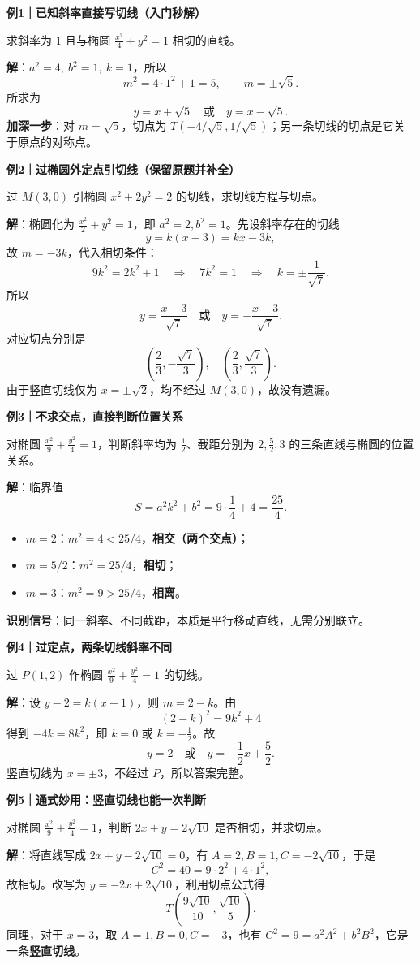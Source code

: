 \begin{examplebox}
\textbf{例1｜已知斜率直接写切线（入门秒解）}\par
求斜率为 $1$ 且与椭圆 $\frac{x^2}{4}+y^2=1$ 相切的直线。\par
\textbf{解}：$a^2=4,\ b^2=1,\ k=1$，所以
\[
m^2=4\cdot1^2+1=5,\qquad m=\pm\sqrt5.
\]
所求为
\[
\boxed{y=x+\sqrt5\quad\text{或}\quad y=x-\sqrt5.}
\]
\textbf{加深一步}：对 $m=\sqrt5$，切点为 $T(-4/\sqrt5,1/\sqrt5)$；另一条切线的切点是它关于原点的对称点。

\medskip
\textbf{例2｜过椭圆外定点引切线（保留原题并补全）}\par
过 $M(3,0)$ 引椭圆 $x^2+2y^2=2$ 的切线，求切线方程与切点。\par
\textbf{解}：椭圆化为 $\frac{x^2}{2}+y^2=1$，即 $a^2=2,b^2=1$。先设斜率存在的切线
\[
y=k(x-3)=kx-3k,
\]
故 $m=-3k$，代入相切条件：
\[
9k^2=2k^2+1\quad\Longrightarrow\quad
7k^2=1\quad\Longrightarrow\quad k=\pm\frac1{\sqrt7}.
\]
所以
\[
\boxed{y=\frac{x-3}{\sqrt7}\quad\text{或}\quad
       y=-\frac{x-3}{\sqrt7}.}
\]
对应切点分别是
\[
\boxed{\left(\frac23,-\frac{\sqrt7}{3}\right),\quad
       \left(\frac23,\frac{\sqrt7}{3}\right).}
\]
由于竖直切线仅为 $x=\pm\sqrt2$，均不经过 $M(3,0)$，故没有遗漏。

\medskip
\textbf{例3｜不求交点，直接判断位置关系}\par
对椭圆 $\frac{x^2}{9}+\frac{y^2}{4}=1$，判断斜率均为 $\frac12$、截距分别为 $2,\frac52,3$ 的三条直线与椭圆的位置关系。\par
\textbf{解}：临界值
\[
S=a^2k^2+b^2=9\cdot\frac14+4=\frac{25}{4}.
\]
\begin{itemize}
    \item $m=2$：$m^2=4<25/4$，\textbf{相交（两个交点）}；
    \item $m=5/2$：$m^2=25/4$，\textbf{相切}；
    \item $m=3$：$m^2=9>25/4$，\textbf{相离}。
\end{itemize}
\textbf{识别信号}：同一斜率、不同截距，本质是平行移动直线，无需分别联立。

\medskip
\textbf{例4｜过定点，两条切线斜率不同}\par
过 $P(1,2)$ 作椭圆 $\frac{x^2}{9}+\frac{y^2}{4}=1$ 的切线。\par
\textbf{解}：设 $y-2=k(x-1)$，则 $m=2-k$。由
\[
(2-k)^2=9k^2+4
\]
得到 $-4k=8k^2$，即 $k=0$ 或 $k=-\frac12$。故
\[
\boxed{y=2\quad\text{或}\quad y=-\frac12x+\frac52.}
\]
竖直切线为 $x=\pm3$，不经过 $P$，所以答案完整。

\medskip
\textbf{例5｜通式妙用：竖直切线也能一次判断}\par
对椭圆 $\frac{x^2}{9}+\frac{y^2}{4}=1$，判断 $2x+y=2\sqrt{10}$ 是否相切，并求切点。\par
\textbf{解}：将直线写成 $2x+y-2\sqrt{10}=0$，有 $A=2,B=1,C=-2\sqrt{10}$，于是
\[
C^2=40=9\cdot2^2+4\cdot1^2,
\]
故相切。改写为 $y=-2x+2\sqrt{10}$，利用切点公式得
\[
\boxed{T\left(\frac{9\sqrt{10}}{10},\frac{\sqrt{10}}5\right).}
\]
同理，对于 $x=3$，取 $A=1,B=0,C=-3$，也有 $C^2=9=a^2A^2+b^2B^2$，它是一条\textbf{竖直切线}。
\end{examplebox}
